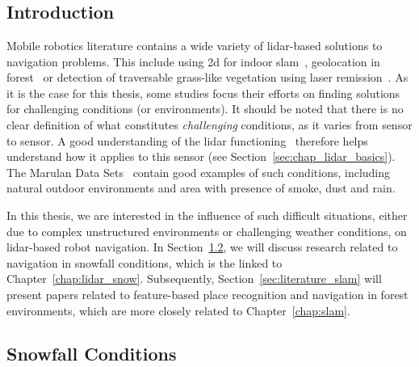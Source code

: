 \chapter{\chapzerotitle}
\label{chap:literature_review}


\section{Introduction}

Mobile robotics literature contains a wide variety of \gls*{lidar}-based solutions to navigation problems. This include using \gls*{2d} for indoor \gls*{slam}~\citep{Grisetti2007, Kohlbrecher2011}, geolocation in forest~\citep{Hussein2015} or detection of traversable grass-like vegetation using laser remission~\citep{Wurm2009}. As it is the case for this thesis, some studies focus their efforts on finding solutions for challenging conditions (or environments). It should be noted that there is no clear definition of what constitutes \emph{challenging} conditions, as it varies from sensor to sensor. A good understanding of the \gls*{lidar} functioning~\citep{Bosch2001} therefore helps understand how it applies to this sensor (see Section~\ref{sec:chap_lidar_basics}). The Marulan Data Sets~\citep{Peynot2010} contain good examples of such conditions, including natural outdoor environments and area with presence of smoke, dust and rain.

In this thesis, we are interested in the influence of such difficult situations, either due to complex unstructured environments or challenging weather conditions, on \gls*{lidar}-based robot navigation. In Section~\ref{sec:literature_snow}, we will discuss research related to navigation in snowfall conditions, which is the linked to Chapter~\ref{chap:lidar_snow}. Subsequently, Section~\ref{sec:literature_slam} will present papers related to feature-based place recognition and navigation in forest environments, which are more closely related to Chapter~\ref{chap:slam}. 


\section{Snowfall Conditions}
\label{sec:literature_snow}

